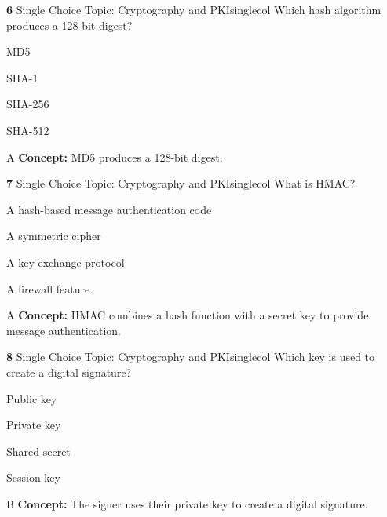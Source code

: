 \documentclass[10pt,a4paper]{article}
\begin{document}
\begin{qcard}{\color{white}\textbf{6} \hfill \small Single Choice \textbar{} Topic: Cryptography and PKI}{singlecol}
Which hash algorithm produces a 128-bit digest?

\begin{qoptions}
\item MD5
\item SHA-1
\item SHA-256
\item SHA-512
\end{qoptions}
\begin{explainbox}{A}
\textbf{Concept:} MD5 produces a 128-bit digest.
\end{explainbox}
\end{qcard}

\begin{qcard}{\color{white}\textbf{7} \hfill \small Single Choice \textbar{} Topic: Cryptography and PKI}{singlecol}
What is HMAC?

\begin{qoptions}
\item A hash-based message authentication code
\item A symmetric cipher
\item A key exchange protocol
\item A firewall feature
\end{qoptions}
\begin{explainbox}{A}
\textbf{Concept:} HMAC combines a hash function with a secret key to provide message authentication.
\end{explainbox}
\end{qcard}

\begin{qcard}{\color{white}\textbf{8} \hfill \small Single Choice \textbar{} Topic: Cryptography and PKI}{singlecol}
Which key is used to create a digital signature?

\begin{qoptions}
\item Public key
\item Private key
\item Shared secret
\item Session key
\end{qoptions}
\begin{explainbox}{B}
\textbf{Concept:} The signer uses their private key to create a digital signature.
\end{explainbox}
\end{qcard}
\end{document}
